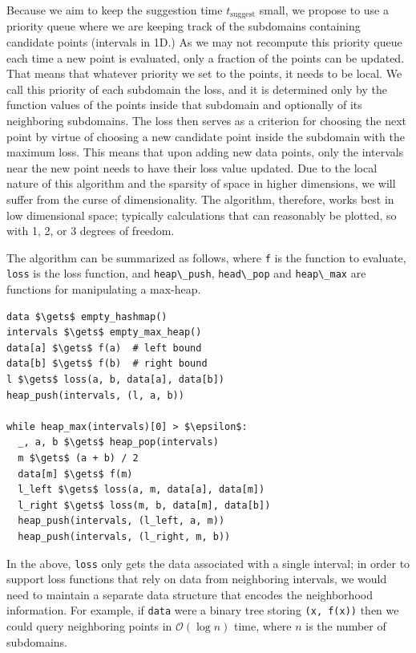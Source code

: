 \documentclass[english, twocolumn, 10pt, aps, superscriptaddress, floatfix, prb, citeautoscript]{revtex4-1}
\newcommand{\passthrough}[1]{\lstset{mathescape=false}#1\lstset{mathescape=true}}
\begin{document}
Because we aim to keep the suggestion time \(t_\textrm{suggest}\) small, we propose to use a priority queue where we are keeping track of the subdomains containing candidate points (intervals in 1D.)
As we may not recompute this priority queue each time a new point is evaluated, only a fraction of the points can be updated.
That means that whatever priority we set to the points, it needs to be local.
We call this priority of each subdomain the loss, and it is determined only by the function values of the points inside that subdomain and optionally of its neighboring subdomains.
The loss then serves as a criterion for choosing the next point by virtue of choosing a new candidate point inside the subdomain with the maximum loss.
This means that upon adding new data points, only the intervals near the new point needs to have their loss value updated.
Due to the local nature of this algorithm and the sparsity of space in higher dimensions, we will suffer from the curse of dimensionality.
The algorithm, therefore, works best in low dimensional space; typically calculations that can reasonably be plotted, so with 1, 2, or 3 degrees of freedom.

The algorithm can be summarized as follows, where \passthrough{\lstinline!f!} is the function to evaluate, \passthrough{\lstinline!loss!} is the loss function, and \passthrough{\lstinline!heap\_push!}, \passthrough{\lstinline!head\_pop!} and \passthrough{\lstinline!heap\_max!} are functions for manipulating a max-heap.

\begin{lstlisting}
data $\gets$ empty_hashmap()
intervals $\gets$ empty_max_heap()
data[a] $\gets$ f(a)  # left bound
data[b] $\gets$ f(b)  # right bound
l $\gets$ loss(a, b, data[a], data[b])
heap_push(intervals, (l, a, b))

while heap_max(intervals)[0] > $\epsilon$:
  _, a, b $\gets$ heap_pop(intervals)
  m $\gets$ (a + b) / 2
  data[m] $\gets$ f(m)
  l_left $\gets$ loss(a, m, data[a], data[m])
  l_right $\gets$ loss(m, b, data[m], data[b])
  heap_push(intervals, (l_left, a, m))
  heap_push(intervals, (l_right, m, b))
\end{lstlisting}

In the above, \passthrough{\lstinline!loss!} only gets the data associated with a single interval;
in order to support loss functions that rely on data from neighboring intervals, we would need to maintain a separate data structure that encodes the neighborhood information.
For example, if \passthrough{\lstinline!data!} were a binary tree storing \passthrough{\lstinline!(x, f(x))!} then we could query neighboring points in \(\mathcal{O}(\log n)\) time, where \(n\) is the number of subdomains.
\end{document}
